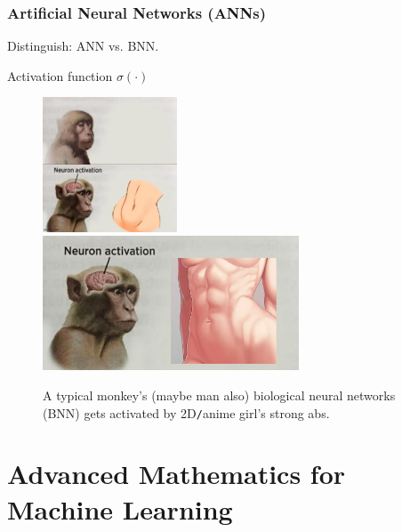 \documentclass{beamer}
\begin{document}
\begin{frame}
	\frametitle{Artificial Neural Networks (ANNs)}
	Distinguish: ANN vs. BNN.
	
	Activation function $\sigma(\cdot)$
	\begin{figure}[H]
		\includegraphics[height=4cm]{neuron_activation_anime}\includegraphics[height=4cm]{neuron_activation}
		\caption{A typical monkey's (maybe man also) biological neural networks (BNN) gets activated by 2D{\tt/}anime girl's strong abs.}
	\end{figure}
\end{frame}

\section{Advanced Mathematics for Machine Learning}
	
\end{document}
